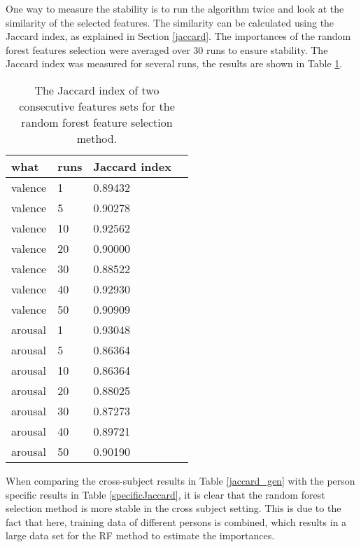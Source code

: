 \npar

One way to measure the stability is to run the algorithm twice and look at the similarity of the selected features. The similarity can be calculated using the Jaccard index, as explained in Section \ref{jaccard}. The importances of the random forest features selection were averaged over 30 runs to ensure stability. The Jaccard index was measured for several runs, the results are shown in Table \ref{Jaccard_gen}.

\begin{table}[H]
\centering
\caption{The Jaccard index of two consecutive features sets for the random forest feature selection method. \label{Jaccard_gen}}
\begin{tabular}{l|l|ll}
\textbf{what} & \textbf{runs} & \textbf{Jaccard index}    \\ \hline
valence       & 1             & 0.89432                   \\
valence       & 5             & 0.90278                   \\
valence       & 10            & 0.92562                   \\
valence       & 20            & 0.90000                   \\
valence       & 30            & 0.88522                   \\
valence       & 40            & 0.92930                   \\
valence       & 50            & 0.90909                   \\ \hline
arousal       & 1             & 0.93048                   \\
arousal       & 5             & 0.86364                   \\
arousal       & 10            & 0.86364                   \\
arousal       & 20            & 0.88025                   \\
arousal       & 30            & 0.87273                   \\
arousal       & 40            & 0.89721                   \\
arousal       & 50            & 0.90190                  
\end{tabular}
\end{table}

When comparing the cross-subject results in Table \ref{jaccard_gen} with the person specific results in Table \ref{specificJaccard}, it is clear that the random forest selection method is more stable in the cross subject setting. This is due to the fact that here, training data of different persons is combined, which results in a large data set for the RF method to estimate the importances.